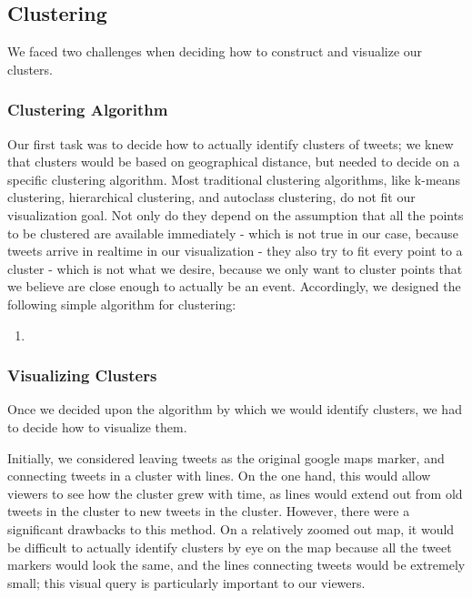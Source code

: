 \documentclass[pdftex,12pt,a4paper]{article}
\begin{document}
\subsection{Clustering}
We faced two challenges when deciding how to construct and visualize our clusters.

\subsubsection{Clustering Algorithm}
Our first task was to decide how to actually identify clusters of tweets; we knew that clusters would be based on geographical distance, but needed to decide on a specific clustering algorithm. Most traditional clustering algorithms, like k-means clustering, hierarchical clustering, and autoclass clustering, do not fit our visualization goal. Not only do they depend on the assumption that all the points to be clustered are available immediately - which is not true in our case, because tweets arrive in realtime in our visualization - they also try to fit every point to a cluster - which is not what we desire, because we only want to cluster points that we believe are close enough to actually be an event. Accordingly, we designed the following simple algorithm for clustering:
\begin{enumerate}
\item
\end{enumerate}

\subsubsection{Visualizing Clusters}
Once we decided upon the algorithm by which we would identify clusters, we had to decide how to visualize them. 

Initially, we considered leaving tweets as the original google maps marker, and connecting tweets in a cluster with lines. On the one hand, this would allow viewers to see how the cluster grew with time, as lines would extend out from old tweets in the cluster to new tweets in the cluster. However, there were a significant drawbacks to this method. On a relatively zoomed out map, it would be difficult to actually identify clusters by eye on the map because all the tweet markers would look the same, and the lines connecting tweets would be extremely small; this visual query is particularly important to our viewers.
\end{document}
